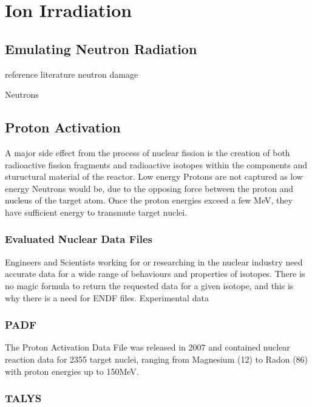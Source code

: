 \section{Ion Irradiation}




\subsection{Emulating Neutron Radiation}



reference literature neutron damage

Neutrons 



\subsection{Proton Activation}

A major side effect from the process of nuclear fission is the creation of both radioactive fission fragments and radioactive isotopes within the components and stuructural material of the reactor.  Low energy Protons are not captured as low energy Neutrons would be, due to the opposing force between the proton and nucleus of the target atom.  Once the proton energies exceed a few MeV, they have sufficient energy to transmute target nuclei.

\subsubsection{Evaluated Nuclear Data Files}

Engineers and Scientists working for or researching in the nuclear industry need accurate data for a wide range of behaviours and properties of isotopes.  There is no magic formula to return the requested data for a given isotope, and this is why there is a need for ENDF files.  Experimental data 


\subsubsection{PADF}

The Proton Activation Data File was released in 2007 and contained nuclear reaction data for 2355 target nuclei, ranging from Magnesium (12) to Radon (86) with proton energies up to 150MeV.


\subsubsection{TALYS}

